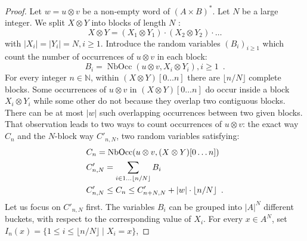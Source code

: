 \documentclass[11pt]{article}
\newcommand{\NN}{\mathbb{N}}
\DeclareMathOperator{\nbocc}{NbOcc}
\begin{document}
\begin{proof}
Let $w = u \otimes v$ be a non-empty word of $(A \times B)^*$.
Let $N$ be a large integer.
We split $X\otimes Y$ into blocks of length $N$ :
\[
X\otimes Y = (X_1\otimes Y_1) \cdot (X_2\otimes Y_2) \cdot  \ldots
\]
with $|X_i|=|Y_i|=N , i \geq 1$.
Introduce the random variables $(B_i)_{i\geq 1}$
which count the number of occurrences of $u \otimes v$
in each block:
\[
B_i = \nbocc(u \otimes v, X_i\otimes Y_i), {i\geq 1}\enspace.
\]
For every integer $n\in \NN$, 
within $(X\otimes Y)[0\ldots n]$
there are $\lfloor n / N \rfloor$ complete blocks.
Some occurrences of $u \otimes v$ in $(X\otimes Y)[0\ldots n]$ do occur inside a block
$X_i\otimes Y_i$ while some other do not because they overlap two contiguous blocks.
There can be at most $|w|$ such overlapping occurrences between two given blocks.
That observation leads to two ways to count occurrences of $u \otimes v$: the exact way $C_n$
and the $N$-block way $C'_{n,N}$, two random variables satisfying:
\begin{align}
\notag
&C_n =  \nbocc(u \otimes v, (X\otimes Y)[0\ldots n])\\
\notag
&C'_{n,N} =  \sum_{i\in 1 \ldots \lfloor n / N \rfloor } B_i \\
\label{lem:random-joinbounds}& C'_{n,N} \leq C_{n} \leq C'_{n+N,N} + |w|\cdot \lfloor n / N \rfloor
\enspace.
\end{align}
Let us focus on $C'_{n,N}$ first.
The variables $B_i$ can be grouped into $|A|^N$ different buckets,
with respect to the corresponding value of $X_i$.
For every $x\in A^{N}$, set $I_n(x)= \{ 1 \leq i \leq \lfloor n / N \rfloor \mid X_i = x\}$,

\end{proof}
\end{document}
